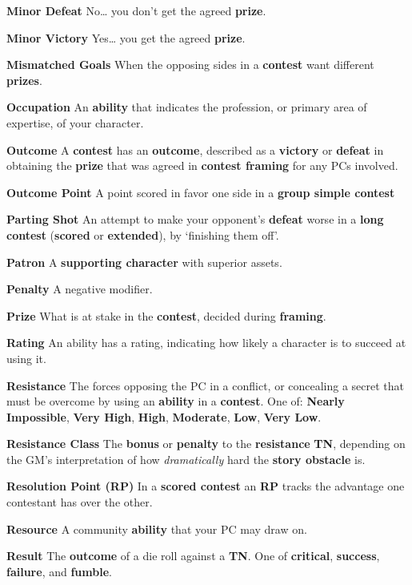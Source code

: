 \documentclass[
]{article}
\begin{document}
\textbf{Minor Defeat} No\ldots{} you don't get the agreed
\textbf{prize}.

\textbf{Minor Victory} Yes\ldots{} you get the agreed \textbf{prize}.

\textbf{Mismatched Goals} When the opposing sides in a \textbf{contest}
want different \textbf{prizes}.

\textbf{Occupation} An \textbf{ability} that indicates the profession,
or primary area of expertise, of your character.

\textbf{Outcome} A \textbf{contest} has an \textbf{outcome}, described
as a \textbf{victory} or \textbf{defeat} in obtaining the \textbf{prize}
that was agreed in \textbf{contest framing} for any PCs involved.

\textbf{Outcome Point} A point scored in favor one side in a
\textbf{group simple contest}

\textbf{Parting Shot} An attempt to make your opponent's \textbf{defeat}
worse in a \textbf{long contest} (\textbf{scored} or \textbf{extended}),
by `finishing them off'.

\textbf{Patron} A \textbf{supporting character} with superior assets.

\textbf{Penalty} A negative modifier.

\textbf{Prize} What is at stake in the \textbf{contest}, decided during
\textbf{framing}.

\textbf{Rating} An ability has a rating, indicating how likely a
character is to succeed at using it.

\textbf{Resistance} The forces opposing the PC in a conflict, or
concealing a secret that must be overcome by using an \textbf{ability}
in a \textbf{contest}. One of: \textbf{Nearly Impossible}, \textbf{Very
High}, \textbf{High}, \textbf{Moderate}, \textbf{Low}, \textbf{Very
Low}.

\textbf{Resistance Class} The \textbf{bonus} or \textbf{penalty} to the
\textbf{resistance} \textbf{TN}, depending on the GM's interpretation of
how \emph{dramatically} hard the \textbf{story obstacle} is.

\textbf{Resolution Point (RP)} In a \textbf{scored contest} an
\textbf{RP} tracks the advantage one contestant has over the other.

\textbf{Resource} A community \textbf{ability} that your PC may draw on.

\textbf{Result} The \textbf{outcome} of a die roll against a
\textbf{TN}. One of \textbf{critical}, \textbf{success},
\textbf{failure}, and \textbf{fumble}.
\end{document}

